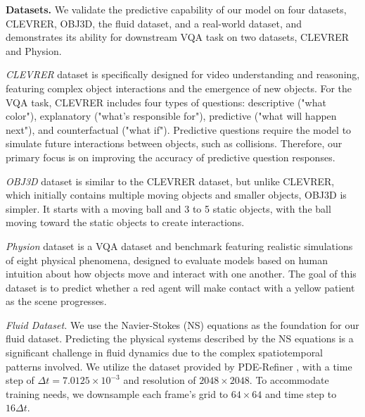 \documentclass[sigconf]{acmart}
\begin{document}
\textbf{Datasets.} We validate the predictive capability of our model on four datasets, CLEVRER, OBJ3D, the fluid dataset, and a real-world dataset, and demonstrates its ability for downstream VQA task on two datasets, CLEVRER and Physion.

\textit{CLEVRER} dataset \cite{yi2019clevrer} is specifically designed for video understanding and reasoning, featuring complex object interactions and the emergence of new objects. For the VQA task, CLEVRER includes four types of questions: descriptive ("what color"), explanatory ("what’s responsible for"), predictive ("what will happen next"), and counterfactual ("what if"). Predictive questions require the model to simulate future interactions between objects, such as collisions. Therefore, our primary focus is on improving the accuracy of predictive question responses.

\textit{OBJ3D} dataset \cite{lin2020improving} is similar to the CLEVRER dataset, but unlike CLEVRER, which initially contains multiple moving objects and smaller objects, OBJ3D is simpler. It starts with a moving ball and 3 to 5 static objects, with the ball moving toward the static objects to create interactions.

\textit{Physion} dataset \cite{bear2021physion} is a VQA dataset and benchmark featuring realistic simulations of eight physical phenomena, designed to evaluate models based on human intuition about how objects move and interact with one another. The goal of this dataset is to predict whether a red agent will make contact with a yellow patient as the scene progresses.

\textit{Fluid Dataset.} We use the Navier-Stokes (NS) equations as the foundation for our fluid dataset. Predicting the physical systems described by the NS equations is a significant challenge in fluid dynamics due to the complex spatiotemporal patterns involved. We utilize the dataset provided by PDE-Refiner \cite{lippe2023pde}, with a time step of $\Delta {t} = 7.0125\times10^{-3}$ and resolution of $2048\times2048$. To accommodate training needs, we downsample each frame's grid to $64\times64$ and time step to $16 \Delta t$. 
\end{document}
